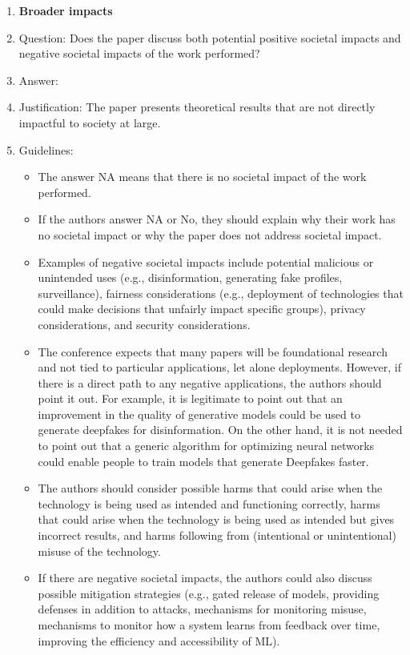\documentclass{article}
\theoremstyle{definition} \newtheorem{definition}{Definition}  \newtheorem{example}{Example}
\theoremstyle{remark} \newtheorem{remark}{Remark}
\newcounter{ct}
\begin{document}
\begin{enumerate}
\item {\bf Broader impacts}
    \item[] Question: Does the paper discuss both potential positive societal impacts and negative societal impacts of the work performed?
    \item[] Answer: \answerNA{} %
    \item[] Justification: The paper presents theoretical results that are not directly impactful to society at large.
    \item[] Guidelines:
    \begin{itemize}
        \item The answer NA means that there is no societal impact of the work performed.
        \item If the authors answer NA or No, they should explain why their work has no societal impact or why the paper does not address societal impact.
        \item Examples of negative societal impacts include potential malicious or unintended uses (e.g., disinformation, generating fake profiles, surveillance), fairness considerations (e.g., deployment of technologies that could make decisions that unfairly impact specific groups), privacy considerations, and security considerations.
        \item The conference expects that many papers will be foundational research and not tied to particular applications, let alone deployments. However, if there is a direct path to any negative applications, the authors should point it out. For example, it is legitimate to point out that an improvement in the quality of generative models could be used to generate deepfakes for disinformation. On the other hand, it is not needed to point out that a generic algorithm for optimizing neural networks could enable people to train models that generate Deepfakes faster.
        \item The authors should consider possible harms that could arise when the technology is being used as intended and functioning correctly, harms that could arise when the technology is being used as intended but gives incorrect results, and harms following from (intentional or unintentional) misuse of the technology.
        \item If there are negative societal impacts, the authors could also discuss possible mitigation strategies (e.g., gated release of models, providing defenses in addition to attacks, mechanisms for monitoring misuse, mechanisms to monitor how a system learns from feedback over time, improving the efficiency and accessibility of ML).
    \end{itemize}
    

\end{enumerate}
\end{document}
